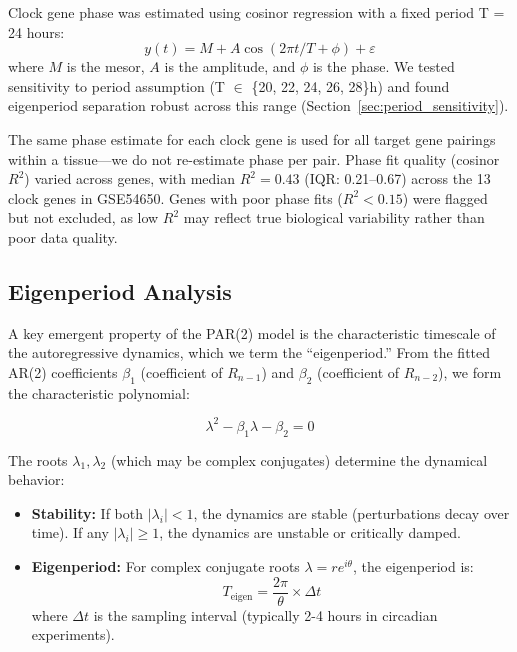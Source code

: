 \documentclass[11pt,a4paper]{article}
\begin{document}
Clock gene phase was estimated using cosinor regression with a fixed period T = 24 hours:
\begin{equation}
y(t) = M + A\cos(2\pi t/T + \phi) + \varepsilon
\end{equation}
where $M$ is the mesor, $A$ is the amplitude, and $\phi$ is the phase. We tested sensitivity to period assumption (T $\in$ \{20, 22, 24, 26, 28\}h) and found eigenperiod separation robust across this range (Section~\ref{sec:period_sensitivity}).

The same phase estimate for each clock gene is used for all target gene pairings within a tissue---we do not re-estimate phase per pair. Phase fit quality (cosinor $R^2$) varied across genes, with median $R^2 = 0.43$ (IQR: 0.21--0.67) across the 13 clock genes in GSE54650. Genes with poor phase fits ($R^2 < 0.15$) were flagged but not excluded, as low $R^2$ may reflect true biological variability rather than poor data quality.

\subsection{Eigenperiod Analysis}
\label{sec:eigenperiod}

A key emergent property of the PAR(2) model is the characteristic timescale of the autoregressive dynamics, which we term the ``eigenperiod.'' From the fitted AR(2) coefficients $\beta_1$ (coefficient of $R_{n-1}$) and $\beta_2$ (coefficient of $R_{n-2}$), we form the characteristic polynomial:

\begin{equation}
\lambda^2 - \beta_1\lambda - \beta_2 = 0
\end{equation}

The roots $\lambda_1, \lambda_2$ (which may be complex conjugates) determine the dynamical behavior:

\begin{itemize}
    \item \textbf{Stability:} If both $|\lambda_i| < 1$, the dynamics are stable (perturbations decay over time). If any $|\lambda_i| \geq 1$, the dynamics are unstable or critically damped.
    
    \item \textbf{Eigenperiod:} For complex conjugate roots $\lambda = re^{i\theta}$, the eigenperiod is:
    \begin{equation}
    T_{\text{eigen}} = \frac{2\pi}{\theta} \times \Delta t
    \end{equation}
    where $\Delta t$ is the sampling interval (typically 2-4 hours in circadian experiments).
\end{itemize}
\end{document}
